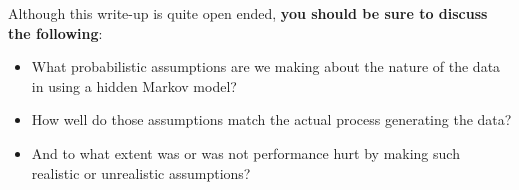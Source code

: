 \documentclass[submit]{harvardml}
\begin{document}
\begin{enumerate}
  Although this write-up is quite open ended, {\bf you should be sure to                                                                                                           
    discuss the following}:
%
\begin{itemize}
\item  What probabilistic assumptions are we making                                                                                                           
  about the nature of the data in using a hidden Markov model?
\item   How well                                                                                                           
  do those assumptions match the actual process generating the data?                                                              \item                                                 
  And to what extent was or was not performance hurt by making such                                                                                                                
  realistic or unrealistic assumptions?  
\end{itemize}

\end{enumerate}

\end{document}

